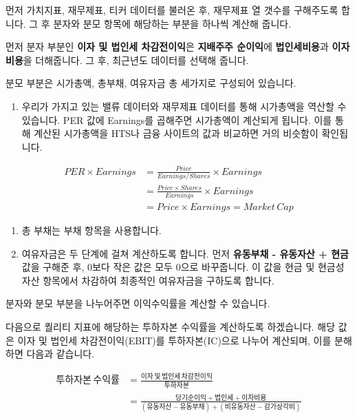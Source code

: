 \documentclass[12pt,]{book}
\providecommand{\tightlist}{%
  \setlength{\itemsep}{0pt}\setlength{\parskip}{0pt}}
\begin{document}
먼저 가치지표, 재무제표, 티커 데이터를 불러온 후, 재무제표 열 갯수를 구해주도록 합니다. 그 후 분자와 분모 항목에 해당하는 부분을 하나씩 계산해 줍니다.

먼저 분자 부분인 \textbf{이자 및 법인세 차감전이익}은 \textbf{지배주주 순이익}에 \textbf{법인세비용}과 \textbf{이자비용}을 더해줍니다. 그 후, 최근년도 데이터를 선택해 줍니다.

분모 부분은 시가총액, 총부채, 여유자금 총 세가지로 구성되어 있습니다.

\begin{enumerate}
\def\labelenumi{\arabic{enumi}.}
\tightlist
\item
  우리가 가지고 있는 밸류 데이터와 재무제표 데이터를 통해 시가총액을 역산할 수 있습니다. PER 값에 Earnings를 곱해주면 시가총액이 계산되게 됩니다. 이를 통해 계산된 시가총액을 HTS나 금융 사이트의 값과 비교하면 거의 비슷함이 확인됩니다.
\end{enumerate}

\begin{equation*} 
\begin{split}
PER \times Earnings & = \frac{Price}{Earnings/Shares} \times Earnings \\
& = \frac{Price \times Shares}{Earnings} \times Earnings \\
& = Price \times Earnings = Market\,Cap
\end{split}
\end{equation*}

\begin{enumerate}
\def\labelenumi{\arabic{enumi}.}
\setcounter{enumi}{1}
\tightlist
\item
  총 부채는 부채 항목을 사용합니다.
\item
  여유자금은 두 단계에 걸쳐 계산하도록 합니다. 먼저 \textbf{유동부채 - 유동자산 + 현금} 값을 구해준 후, 0보다 작은 값은 모두 0으로 바꾸줍니다. 이 값을 현금 및 현금성자산 항목에서 차감하여 최종적인 여유자금을 구하도록 합니다.
\end{enumerate}

분자와 분모 부분을 나누어주면 이익수익률을 계산할 수 있습니다.

다음으로 퀄리티 지표에 해당하는 투하자본 수익률을 계산하도록 하겠습니다. 해당 값은 이자 및 법인세 차감전이익(EBIT)를 투하자본(IC)으로 나누어 계산되며, 이를 분해하면 다음과 같습니다.

\begin{small}
\begin{equation*} 
\begin{split}
투하자본\,수익률 & = \frac{이자\,및\,법인세\,차감전이익}{투하자본} \\
& = \frac{당기순이익 + 법인세 + 이자비용}{(유동자산 - 유동부채) + (비유동자산 - 감가상각비)}
\end{split}
\end{equation*} 
\end{small}
\end{document}
